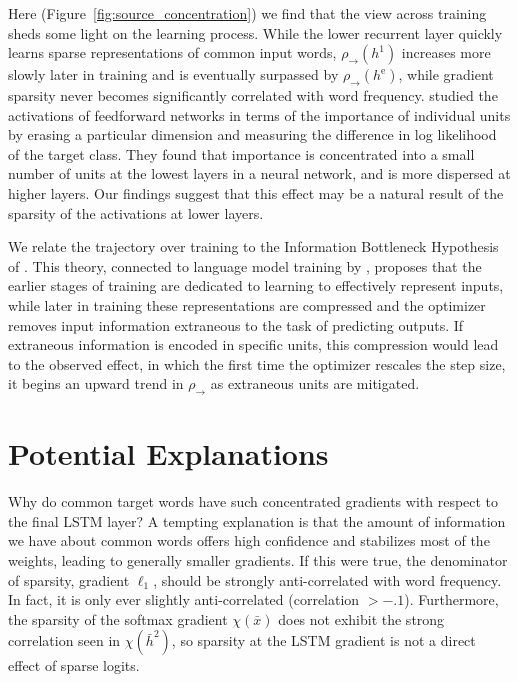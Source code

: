Here (Figure~\ref{fig:source_concentration}) we find that the view across training sheds some light on the learning process. While the lower recurrent layer quickly learns sparse representations of common input words, $\rho_{\rightarrow}(h^1)$ increases more slowly later in training and is eventually surpassed by $\rho_{\rightarrow}(h^\textrm{e})$, while gradient sparsity never becomes significantly correlated with word frequency.
\citeauthor{li_understanding_2016} studied the activations of  feedforward networks in terms of  the importance of individual units  by erasing a particular dimension and measuring the difference in log likelihood of the target class. They found that importance  is concentrated into a small number of units at the lowest layers in a neural network, and is more dispersed at higher layers. Our findings suggest that  this effect may be a natural result of the sparsity of the activations at lower layers.



We relate the trajectory over training to the Information Bottleneck Hypothesis of \citeauthor{shwartz-ziv_opening_2017}. This theory, connected to language model training by \citeauthor{saphra2018understanding}, proposes that the earlier stages of training  are dedicated to  learning to effectively represent inputs, while later in training these representations are compressed and the optimizer  removes input  information extraneous to the task of predicting outputs. If extraneous information is encoded in specific  units, this compression would lead to the observed effect, in which  the first time the optimizer rescales the step size, it  begins an upward trend in $\rho_{\rightarrow}$ as  extraneous units are mitigated.


\section{Potential Explanations}

Why do common target words have such concentrated gradients with respect to the final LSTM layer?  %
A tempting explanation is that the amount of information we have about common words offers high confidence and stabilizes most of the weights, leading to generally smaller gradients. If this were true, the denominator of sparsity, gradient $\ell_1$, should be  strongly anti-correlated with word frequency. In fact, it is only ever slightly anti-correlated (correlation $ > -.1$).  Furthermore, the sparsity of the softmax gradient $\chi(\bar{x})$ does not exhibit the strong correlation seen in $\chi(\bar{h}^2)$, so sparsity at the LSTM gradient is not a direct effect of sparse logits. 

